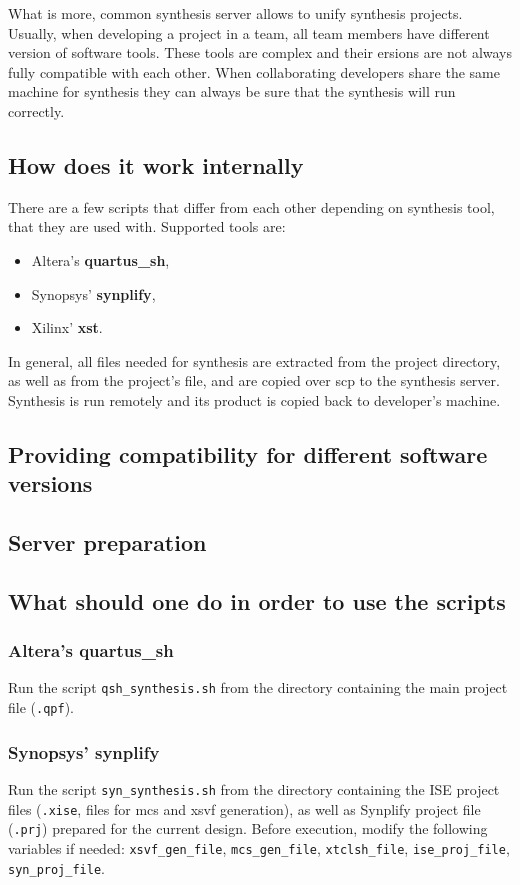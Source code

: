 \documentclass[a4paper,10pt]{article}
\begin{document}
What is more, common synthesis server allows to unify synthesis projects. Usually, when developing a project in a team, all team members have different version of software tools. These tools are complex and their ersions are not always fully compatible with each other. When collaborating developers share the same machine for synthesis they can always be sure that the synthesis will run correctly.
\subsection{How does it work internally}
There are a few scripts that differ from each other depending on synthesis tool, that they are used with. Supported tools are:
\begin{itemize}
\item Altera's \textbf{quartus\_sh},
\item Synopsys' \textbf{synplify},
\item Xilinx' \textbf{xst}.
\end{itemize}
In general, all files needed for synthesis are extracted from the project directory, as well as from the project's file, and are copied over scp to the synthesis server. Synthesis is run remotely and its product is copied back to developer's machine.
\subsection{Providing compatibility for different software versions}
\subsection{Server preparation}
\subsection{What should one do in order to use the scripts}
\subsubsection{Altera's quartus\_sh}
Run the script \verb!qsh_synthesis.sh! from the directory containing the main project file (\verb!.qpf!).  
\subsubsection{Synopsys' synplify}
Run the script \verb!syn_synthesis.sh! from the directory containing the ISE project files (\verb!.xise!, files for mcs and xsvf generation), as well as Synplify project file (\verb!.prj!) prepared for the current design. Before execution, modify the following variables if needed: \verb!xsvf_gen_file!, \verb!mcs_gen_file!, \verb!xtclsh_file!, \verb!ise_proj_file!, \verb!syn_proj_file!.
\end{document}
